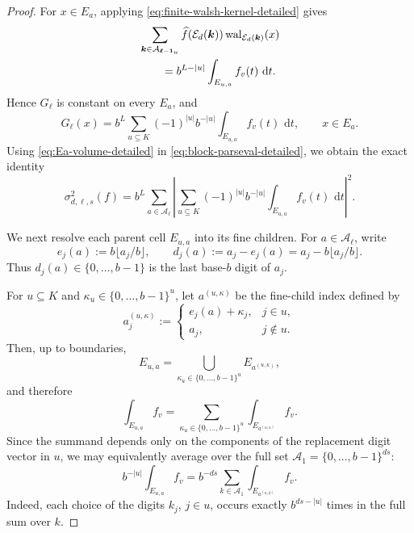 \documentclass[11pt]{article}
\newcommand{\E}{\mathcal E}
\newcommand{\wal}{\operatorname{wal}}
\newcommand{\dd}{\,\mathrm d}
\begin{document}
\begin{proof}
For $x\in E_a$, applying
\eqref{eq:finite-walsh-kernel-detailed} gives
\begin{align}
 &\sum_{\boldsymbol k\in
       \mathcal A_{\boldsymbol\ell-\boldsymbol1_u}}
 \widehat f(\E_d(\boldsymbol k))
 \wal_{\E_d(\boldsymbol k)}(x)
 \notag\\
 &\qquad
 =
 b^{L-|u|}
 \int_{E_{u,a}} f_v(t)\,\dd t.
 \label{eq:lower-projection-cell-detailed}
\end{align}
Hence $G_{\boldsymbol\ell}$ is constant on every $E_a$, and
\begin{equation}\label{eq:G-on-cell-detailed}
 G_{\boldsymbol\ell}(x)
 =
 b^L
 \sum_{u\subseteq K}
 (-1)^{|u|}b^{-|u|}
 \int_{E_{u,a}}f_v(t)\,\dd t,
 \qquad x\in E_a.
\end{equation}
Using \eqref{eq:Ea-volume-detailed} in
\eqref{eq:block-parseval-detailed}, we obtain the exact identity
\begin{equation}\label{eq:block-cell-exact-detailed}
 \sigma_{d,\boldsymbol\ell,s}^2(f)
 =
 b^L
 \sum_{a\in\mathcal A_{\boldsymbol\ell}}
 \left|
   \sum_{u\subseteq K}
   (-1)^{|u|}b^{-|u|}
   \int_{E_{u,a}}f_v(t)\,\dd t
 \right|^2.
\end{equation}

We next resolve each parent cell $E_{u,a}$ into its fine children.
For $a\in\mathcal A_{\boldsymbol\ell}$, write
\[
 e_j(a):=b\lfloor a_j/b\rfloor,
 \qquad
 d_j(a):=a_j-e_j(a)
        =a_j-b\lfloor a_j/b\rfloor.
\]
Thus $d_j(a)\in\{0,\ldots,b-1\}$ is the last base-$b$ digit
of $a_j$.

For $u\subseteq K$ and
$\kappa_u\in\{0,\ldots,b-1\}^{u}$, let
$a^{(u,\kappa)}$ be the fine-child index defined by
\[
 a^{(u,\kappa)}_j
 :=
 \begin{cases}
  e_j(a)+\kappa_j, & j\in u,\\
  a_j, & j\notin u.
 \end{cases}
\]
Then, up to boundaries,
\[
 E_{u,a}
 =
 \bigcup_{\kappa_u\in\{0,\ldots,b-1\}^{u}}
 E_{a^{(u,\kappa)}},
\]
and therefore
\begin{equation}\label{eq:parent-children-detailed}
 \int_{E_{u,a}}f_v
 =
 \sum_{\kappa_u\in\{0,\ldots,b-1\}^{u}}
 \int_{E_{a^{(u,\kappa)}}}f_v.
\end{equation}
Since the summand depends only on the components of the replacement
digit vector in $u$, we may equivalently average over the full set
$\mathcal A_1=\{0,\ldots,b-1\}^{ds}$:
\begin{equation}\label{eq:full-digit-average-detailed}
 b^{-|u|}
 \int_{E_{u,a}}f_v
 =
 b^{-ds}
 \sum_{k\in\mathcal A_1}
 \int_{E_{a^{(u,k)}}}f_v.
\end{equation}
Indeed, each choice of the digits $k_j$, $j\in u$, occurs exactly
$b^{ds-|u|}$ times in the full sum over $k$.


\end{proof}
\end{document}
